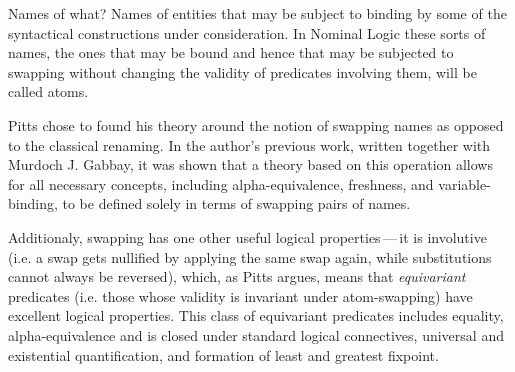 \documentclass[english, mgr]{iithesis}
\renewcommand{\it}[1]{\textit{#1}}
\newcommand{\mdash}{\,---\,}
\def\-{{\mdash}}
\begin{document}
\begin{mdframed}[frametitle={\textnormal{\footnotesize \textbf{\citeauthor{nominal-logic}}, \textit{\citetitle{nominal-logic}}\cite{nominal-logic}:}}]
Names of what? Names of entities that may be subject to binding by some of
the syntactical constructions under consideration. In Nominal Logic these sorts of
names, the ones that may be bound and hence that may be subjected to swapping
without changing the validity of predicates involving them, will be called atoms.
\end{mdframed}

Pitts chose to found his theory around the notion of swapping names
as opposed to the classical renaming.
In the author's previous work\cite{abstract-syntax-variable-binding}, written together with Murdoch J. Gabbay,
it was shown that a theory based on this operation allows for all necessary concepts,
including alpha-equivalence, freshness, and variable-binding,
to be defined solely in terms of swapping pairs of names.

Additionaly, swapping has one other useful logical properties\-it is involutive
(i.e. a swap gets nullified by applying the same swap again, while substitutions cannot always be reversed),
which, as Pitts argues, means that \it{equivariant} predicates (i.e. those whose validity is invariant under atom-swapping)
have excellent logical properties.
This class of equivariant predicates includes equality, alpha-equivalence and is
closed under standard logical connectives, universal and existential quantification,
and formation of least and greatest fixpoint.
\end{document}
